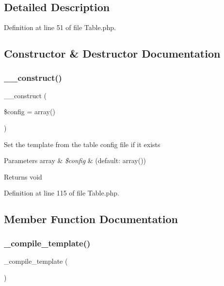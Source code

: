 \subsection{Detailed Description}


Definition at line 51 of file Table.\+php.



\subsection{Constructor \& Destructor Documentation}
\mbox{\label{class_c_i___table_af7f9493844d2d66e924e3c1df51ce616}} 
\subsubsection{\texorpdfstring{\_\_construct()}{\_\_construct()}}
{\footnotesize\ttfamily \+\_\+\+\_\+construct (\begin{DoxyParamCaption}\item[{}]{\$config = {\ttfamily array()} }\end{DoxyParamCaption})}

Set the template from the table config file if it exists


\begin{DoxyParams}[1]{Parameters}
array & {\em \$config} & (default\+: array()) \\
\hline
\end{DoxyParams}
\begin{DoxyReturn}{Returns}
void 
\end{DoxyReturn}


Definition at line 115 of file Table.\+php.



\subsection{Member Function Documentation}
\mbox{\label{class_c_i___table_a7f408fd4eecadb5799d5ae004170c4d6}} 
\subsubsection{\texorpdfstring{\_compile\_template()}{\_compile\_template()}}
{\footnotesize\ttfamily \+\_\+compile\+\_\+template (\begin{DoxyParamCaption}{ }\end{DoxyParamCaption})\hspace{0.3cm}{\ttfamily [protected]}}

